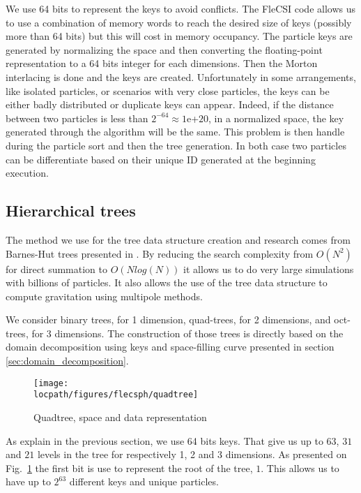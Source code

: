 We use 64 bits to represent the keys to avoid conflicts.
The FleCSI code allows us to use a combination of memory words to reach the desired size of keys (possibly more than 64 bits) but this will cost in memory occupancy. 
The particle keys are generated by normalizing the space and then converting the floating-point representation to a 64 bits integer for each dimensions. 
Then the Morton interlacing is done and the keys are created. 
Unfortunately in some arrangements, like isolated particles, or scenarios with very close particles, the keys can be either badly distributed or duplicate keys can appear. 
Indeed, if the distance between two particles is less than $2^{-64} \approx 1$e+$20$, in a normalized space, the key generated through the algorithm will be the same. 
This problem is then handle during the particle sort and then the tree generation. 
In both case two particles can be differentiate based on their unique ID generated at the beginning execution. 

\subsection{Hierarchical trees}
\label{sec:trees}

The method we use for the tree data structure creation and research comes from Barnes-Hut trees presented in \cite{barnes1986hierarchical,barnes1990modified}. 
By reducing the search complexity from $O(N^2)$ for direct summation to $O(Nlog(N))$ it allows us to do very large simulations with billions of particles. 
It also allows the use of the tree data structure to compute gravitation using multipole methods.

We consider binary trees, for 1 dimension, quad-trees, for 2 dimensions, and oct-trees, for 3 dimensions. 
The construction of those trees is directly based on the domain decomposition using keys and space-filling curve presented in section \ref{sec:domain_decomposition}. 

\begin{figure}
\centering
\texttt{[image: \\locpath/figures/flecsph/quadtree]}
\caption{Quadtree, space and data representation}
\label{fig:quadtree}
\end{figure}

As explain in the previous section, we use 64 bits keys.
That give us up to $63$, $31$ and $21$ levels in the tree for respectively 1, 2 and 3 dimensions. 
As presented on Fig.~\ref{fig:quadtree} the first bit is use to represent the root of the tree, $1$.
This allows us to have up to $2^{63}$ different keys and unique particles.  

